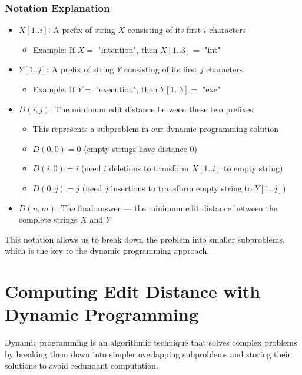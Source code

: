 \documentclass[11pt,a4paper]{article}
\theoremstyle{definition}
\theoremstyle{plain}
\theoremstyle{remark}
\begin{document}
\subsubsection{Notation Explanation}

\begin{itemize}
    \item \textbf{$X[1..i]$}: A prefix of string $X$ consisting of its first $i$ characters
    \begin{itemize}
        \item Example: If $X = $ "intention", then $X[1..3] = $ "int"
    \end{itemize}
    
    \item \textbf{$Y[1..j]$}: A prefix of string $Y$ consisting of its first $j$ characters
    \begin{itemize}
        \item Example: If $Y = $ "execution", then $Y[1..3] = $ "exe"
    \end{itemize}
    
    \item \textbf{$D(i,j)$}: The minimum edit distance between these two prefixes
    \begin{itemize}
        \item This represents a subproblem in our dynamic programming solution
        \item $D(0,0) = 0$ (empty strings have distance 0)
        \item $D(i,0) = i$ (need $i$ deletions to transform $X[1..i]$ to empty string)
        \item $D(0,j) = j$ (need $j$ insertions to transform empty string to $Y[1..j]$)
    \end{itemize}
    
    \item \textbf{$D(n,m)$}: The final answer — the minimum edit distance between the complete strings $X$ and $Y$
\end{itemize}

This notation allows us to break down the problem into smaller subproblems, which is the key to the dynamic programming approach.

\section{Computing Edit Distance with Dynamic Programming}

Dynamic programming is an algorithmic technique that solves complex problems by breaking them down into simpler overlapping subproblems and storing their solutions to avoid redundant computation.
\end{document}
